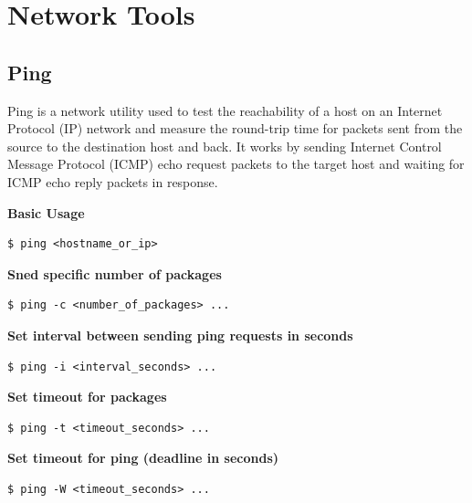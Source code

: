 \documentclass{article}
\newenvironment{codetemplate}[1][]{%
  \mybasecolorbox[#1]
  \itshape
}{%
  \endmybasecolorbox
}
\begin{document}
\newpage
\section{Network Tools}

\subsection{Ping}

Ping is a network utility used to test the reachability of a host on an Internet Protocol (IP) network and measure the round-trip time for packets sent from the source to the destination host and back. It works by sending Internet Control Message Protocol (ICMP) echo request packets to the target host and waiting for ICMP echo reply packets in response.

\textbf{Basic Usage}
\begin{codetemplate}{}
\begin{verbatim}
$ ping <hostname_or_ip>
\end{verbatim}
\end{codetemplate}

\textbf{Sned specific number of packages}
\begin{codetemplate}{}
\begin{verbatim}
$ ping -c <number_of_packages> ...
\end{verbatim}
\end{codetemplate}

\textbf{Set interval between sending ping requests in seconds}
\begin{codetemplate}{}
\begin{verbatim}
$ ping -i <interval_seconds> ...
\end{verbatim}
\end{codetemplate}

\textbf{Set timeout for packages}
\begin{codetemplate}{}
\begin{verbatim}
$ ping -t <timeout_seconds> ...
\end{verbatim}
\end{codetemplate}

\textbf{Set timeout for ping (deadline in seconds)}
\begin{codetemplate}{}
\begin{verbatim}
$ ping -W <timeout_seconds> ...
\end{verbatim}
\end{codetemplate}
\end{document}
